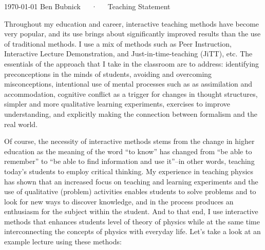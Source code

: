 \documentclass[11pt, a4paper]{awesome-cv}
\begin{document}

\makecvfooter
  {\today}
  {Ben Bubnick~~~·~~~Teaching Statement}
  {}

\makelettertitle

\begin{cvletter}

Throughout my education and career, interactive teaching methods have become very popular, and its use brings about significantly improved results than the use of traditional methods.  I use a mix of methods such as Peer Instruction, Interactive Lecture Demonstration, and Just-in-time-teaching (JiTT), etc.  The essentials of the approach that I take in the classroom are to address: identifying preconceptions in the minds of students, avoiding and overcoming misconceptions, intentional use of mental processes such as as assimilation and accommodation, cognitive conflict as a trigger for changes in thought structures, simpler and more qualitative learning experiments, exercises to improve understanding, and explicitly making the connection between formalism and the real world.  

Of course, the necessity of interactive methods stems from the change in higher education as the meaning of the word “to know” has changed from “be able to remember” to “be able to find information and use it”--in other words, teaching today's students to employ critical thinking.  My experience in teaching physics has shown that an increased focus on teaching and learning experiments and the use of qualitative (problem) activities enables students to solve problems and to look for new ways to discover knowledge, and in the process produces an enthusiasm for the subject within the student.  And to that end, I use interactive methods that enhances students level of theory of physics while at the same time interconnecting the concepts of physics with everyday life.  Let's take a look at an example lecture using these methods:

\begin{enumerate}


\end{enumerate}
\end{cvletter}
\end{document}
